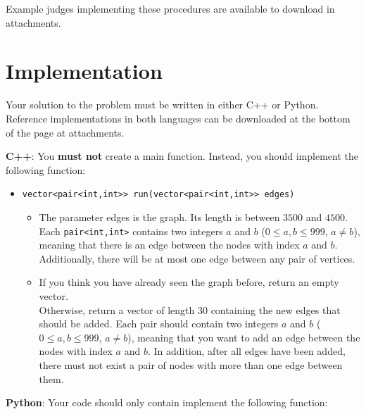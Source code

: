 Example judges implementing these procedures are available to download in attachments.

\section*{Implementation}
Your solution to the problem must be written in either C++ or Python. Reference implementations
in both languages can be downloaded at the bottom of the page at attachments.

\textbf{C++}:
You \textbf{must not} create a main function. Instead, you should implement the following function:\\

\begin{itemize}
  \item \verb|vector<pair<int,int>> run(vector<pair<int,int>> edges)| \\
  \begin{itemize}
    \item The parameter edges is the graph. Its length is between $3500$ and $4500$.
    Each \verb|pair<int,int>| contains two integers $a$ and $b$ ($0 \leq a,b \leq 999$, $a \neq b$),
    meaning that there is an edge between the nodes with index $a$ and $b$. Additionally,
    there will be at most one edge between any pair of vertices.
    \item If you think you have already seen the graph before, return an empty vector.\\
    Otherwise, return a vector of length 30 containing the new edges that should be added.
    Each pair should contain two integers $a$ and $b$ ($0 \leq a,b \leq 999$, $a \neq b$),
    meaning that you want to add an edge between the nodes with index $a$ and $b$.
    In addition, after all edges have been added, there must not exist a pair of nodes with more than one edge between them.
  \end{itemize}
\end{itemize}


\textbf{Python}:
Your code should only contain implement the following function:\\

